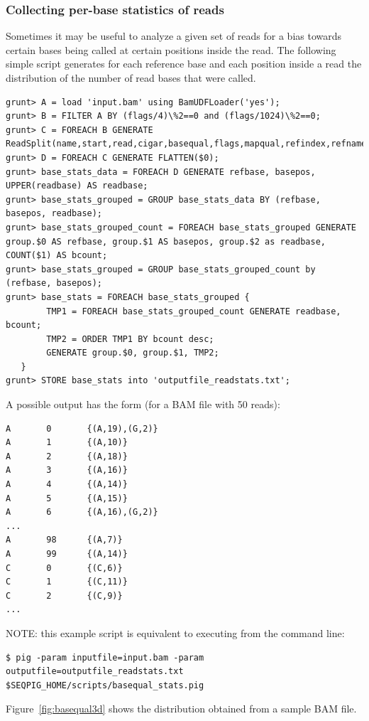 \subsubsection{Collecting per-base statistics of reads}
Sometimes it may be useful to analyze a given set of reads for a bias
towards certain bases being called at certain positions inside the
read. The following simple script generates for each reference base and
each position inside a read the distribution of the number of read bases
that were called.
\begin{lstlisting}
grunt> A = load 'input.bam' using BamUDFLoader('yes');
grunt> B = FILTER A BY (flags/4)\%2==0 and (flags/1024)\%2==0;
grunt> C = FOREACH B GENERATE ReadSplit(name,start,read,cigar,basequal,flags,mapqual,refindex,refname,attributes#'MD');
grunt> D = FOREACH C GENERATE FLATTEN($0);
grunt> base_stats_data = FOREACH D GENERATE refbase, basepos, UPPER(readbase) AS readbase;
grunt> base_stats_grouped = GROUP base_stats_data BY (refbase, basepos, readbase);
grunt> base_stats_grouped_count = FOREACH base_stats_grouped GENERATE group.$0 AS refbase, group.$1 AS basepos, group.$2 as readbase, COUNT($1) AS bcount;
grunt> base_stats_grouped = GROUP base_stats_grouped_count by (refbase, basepos);
grunt> base_stats = FOREACH base_stats_grouped {
        TMP1 = FOREACH base_stats_grouped_count GENERATE readbase, bcount;
        TMP2 = ORDER TMP1 BY bcount desc;
        GENERATE group.$0, group.$1, TMP2;
   }
grunt> STORE base_stats into 'outputfile_readstats.txt';
\end{lstlisting}
A possible output has the form (for a BAM file with 50 reads):
\begin{lstlisting}
A       0       {(A,19),(G,2)}
A       1       {(A,10)}
A       2       {(A,18)}
A       3       {(A,16)}
A       4       {(A,14)}
A       5       {(A,15)}
A       6       {(A,16),(G,2)}
...
A       98      {(A,7)}
A       99      {(A,14)}
C       0       {(C,6)}
C       1       {(C,11)}
C       2       {(C,9)}
...
\end{lstlisting}
NOTE: this example script is equivalent to executing from the command line:
\begin{lstlisting}
$ pig -param inputfile=input.bam -param outputfile=outputfile_readstats.txt $SEQPIG_HOME/scripts/basequal_stats.pig
\end{lstlisting}
Figure~\ref{fig:basequal3d} shows the distribution obtained from a sample BAM file.

